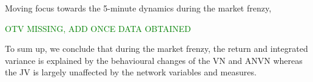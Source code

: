 Moving focus towards the 5-minute  dynamics during the market frenzy,  

\textcolor{green}{OTV MISSING, ADD ONCE DATA OBTAINED}

To sum up, we conclude that during the market frenzy, the return and integrated variance is explained by the behavioural changes of the VN and ANVN whereas the JV is largely unaffected by the network variables and measures.  %
